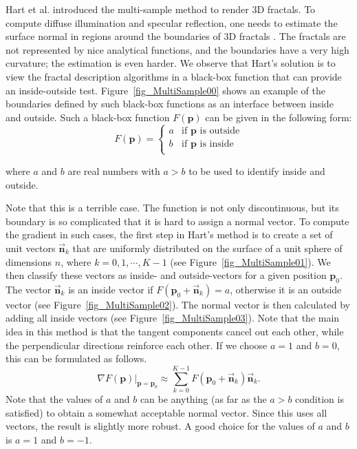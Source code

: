 \documentclass{article}
\begin{document}
Hart et al. introduced the multi-sample method to render 3D fractals. To compute diffuse illumination and specular reflection, one needs to estimate the surface normal in regions around the boundaries of 3D fractals \cite{hart1989}. The fractals are not represented by nice analytical functions, and the boundaries have a very high curvature; the estimation is even harder. We observe that Hart's solution is to view the fractal description algorithms in a black-box function that can provide an inside-outside test. Figure~\ref{fig_MultiSample00} shows an example of the boundaries defined by such black-box functions as an interface between inside and outside. Such a black-box function $F(\mathbf{p})$ can be given in the following form: 
$$ 
F(\mathbf{p}) =\left\{  
\begin{array}{ll} 
      a &
      \mbox{if $\mathbf{p}$ is outside} \\ 
      b &
      \mbox{if $\mathbf{p}$ is inside} \\ 
\end{array} 
\right.    	            
$$ 

where $a$ and $b$ are real numbers with $a>b$ to be used to identify inside and outside. 

Note that this is a terrible case. The function is not only discontinuous, but its boundary is so complicated that it is hard to assign a normal vector. To compute the gradient in such cases, the first step in Hart's method is to create a set of unit vectors $\vec{\mathbf{n}}_k$ that are uniformly distributed on the surface of a unit sphere of dimensions $n$, where $k=0,1,\cdots, K-1$ (see Figure~\ref{fig_MultiSample01}). We then classify these vectors as inside- and outside-vectors for a given position $\mathbf{p}_0$. The vector $\vec{\mathbf{n}}_k$ is an inside vector if $F(\mathbf{p}_0 + \vec{\mathbf{n}}_k) = a$, otherwise it is an outside vector (see Figure~\ref{fig_MultiSample02}). The normal vector is then calculated by adding all inside vectors (see Figure~\ref{fig_MultiSample03}). Note that the main idea in this method is that the tangent components cancel out each other, while the perpendicular directions reinforce each other. If we choose $a=1$ and $b=0$, this can be formulated as follows. 
$$
\left. \nabla F(\mathbf{p}) \right|_{\mathbf{p}=\mathbf{p}_0}  \approx \sum_{k=0}^{K-1}  F(\mathbf{p}_0 + \vec{\mathbf{n}}_k) \vec{\mathbf{n}}_k. \nonumber
$$
Note that the values of $a$ and $b$ can be anything (as far as the $a>b$ condition is satisfied) to obtain a somewhat acceptable normal vector. Since this uses all vectors, the result is slightly more robust. A good choice for the values of $a$ and $b$ is $a=1$ and $b=-1$. 
\end{document}
